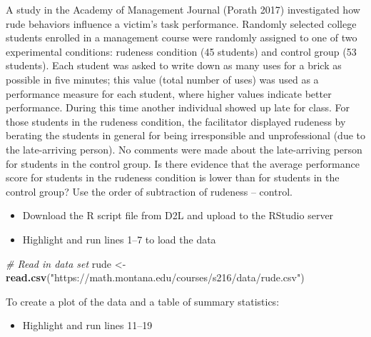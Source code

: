 \documentclass[
]{report}
\newenvironment{Shaded}{\begin{snugshade}}{\end{snugshade}}
\newcommand{\CommentTok}[1]{\textcolor[rgb]{0.56,0.35,0.01}{\textit{#1}}}
\newcommand{\FunctionTok}[1]{\textcolor[rgb]{0.13,0.29,0.53}{\textbf{#1}}}
\newcommand{\NormalTok}[1]{#1}
\newcommand{\OtherTok}[1]{\textcolor[rgb]{0.56,0.35,0.01}{#1}}
\newcommand{\StringTok}[1]{\textcolor[rgb]{0.31,0.60,0.02}{#1}}
\providecommand{\tightlist}{%
  \setlength{\itemsep}{0pt}\setlength{\parskip}{0pt}}
\begin{document}
A study in the Academy of Management Journal (Porath 2017) investigated how rude behaviors influence a victim's task performance. Randomly selected college students enrolled in a management course were randomly assigned to one of two experimental conditions: rudeness condition (45 students) and control group (53 students). Each student was asked to write down as many uses for a brick as possible in five minutes; this value (total number of uses) was used as a performance measure for each student, where higher values indicate better performance. During this time another individual showed up late for class. For those students in the rudeness condition, the facilitator displayed rudeness by berating the students in general for being irresponsible and unprofessional (due to the late-arriving person). No comments were made about the late-arriving person for students in the control group. Is there evidence that the average performance score for students in the rudeness condition is lower than for students in the control group? Use the order of subtraction of rudeness -- control.

\begin{itemize}
\item
  Download the R script file from D2L and upload to the RStudio server
\item
  Highlight and run lines 1--7 to load the data
\end{itemize}

\begin{Shaded}
\begin{Highlighting}[]
\CommentTok{\# Read in data set}
\NormalTok{rude }\OtherTok{\textless{}{-}} \FunctionTok{read.csv}\NormalTok{(}\StringTok{"https://math.montana.edu/courses/s216/data/rude.csv"}\NormalTok{)}
\end{Highlighting}
\end{Shaded}

\newpage

To create a plot of the data and a table of summary statistics:

\begin{itemize}
\tightlist
\item
  Highlight and run lines 11--19
\end{itemize}
\end{document}
